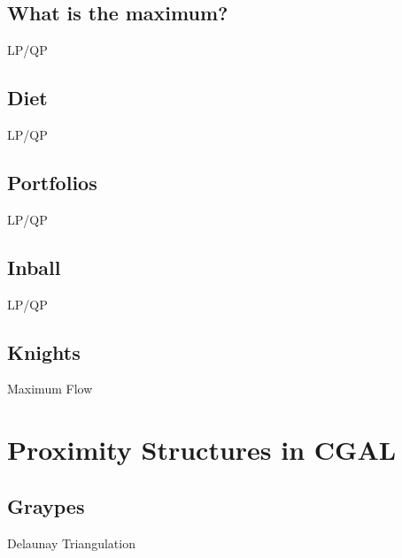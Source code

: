 \documentclass[10pt,a4paper,twoside]{report}
\begin{document}
\subsection*{What is the maximum?}
\begin{keywords}LP/QP\end{keywords}


\newpage
\subsection*{Diet}
\begin{keywords}LP/QP\end{keywords}


\newpage
\subsection*{Portfolios}
\begin{keywords}LP/QP\end{keywords}


\newpage
\subsection*{Inball}
\begin{keywords}LP/QP\end{keywords}


\newpage
\subsection*{Knights}
\begin{keywords}Maximum Flow\end{keywords}



\newpage
\section{Proximity Structures in CGAL}

\subsection*{Graypes}
\begin{keywords}Delaunay Triangulation\end{keywords}

\end{document}
